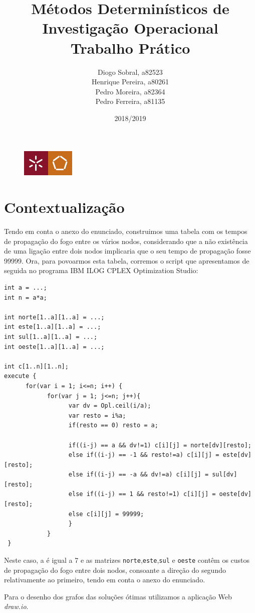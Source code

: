 \documentclass[11pt]{article} %
\title{Métodos Determinísticos de Investigação Operacional \\ \large Trabalho Prático}
\author{Diogo Sobral, a82523 \\ Henrique Pereira, a80261 \\ Pedro Moreira, a82364 \\ Pedro Ferreira, a81135}
\date{2018/2019}
\begin{document}
\maketitle

\begin{figure}[!b]
    \centering
    \includegraphics[width=1in]{um_eeng.jpg}
\end{figure}

\newpage

\section*{Contextualização}
Tendo em conta o anexo do enunciado, construimos uma tabela com os tempos de propagação do fogo entre os vários nodos, considerando que a não existência de uma ligação entre dois nodos implicaria que o seu tempo de propagação fosse 99999. Ora, para povoarmos esta tabela, corremos o script que apresentamos de seguida no programa IBM ILOG CPLEX Optimization Studio:
\begin{verbatim}
int a = ...;
int n = a*a;

int norte[1..a][1..a] = ...;
int este[1..a][1..a] = ...;
int sul[1..a][1..a] = ...;
int oeste[1..a][1..a] = ...;
 
int c[1..n][1..n];
execute {
      for(var i = 1; i<=n; i++) {
            for(var j = 1; j<=n; j++){
                  var dv = Opl.ceil(i/a);
                  var resto = i%a;
                  if(resto == 0) resto = a;

                  if((i-j) == a && dv!=1) c[i][j] = norte[dv][resto];
                  else if((i-j) == -1 && resto!=a) c[i][j] = este[dv][resto];
                  else if((i-j) == -a && dv!=a) c[i][j] = sul[dv][resto];
                  else if((i-j) == 1 && resto!=1) c[i][j] = oeste[dv][resto];
                  else c[i][j] = 99999;
                  }
            }
 }
\end{verbatim}
Neste caso, a é igual a 7 e as matrizes \texttt{norte},\texttt{este},\texttt{sul} e \texttt{oeste} contêm os custos de propagação do fogo entre dois nodos, consoante a direção do segundo relativamente ao primeiro, tendo em conta o anexo do enunciado.


Para o desenho dos grafos das soluções ótimas utilizamos a aplicação Web \textit{draw.io}.
\end{document}
